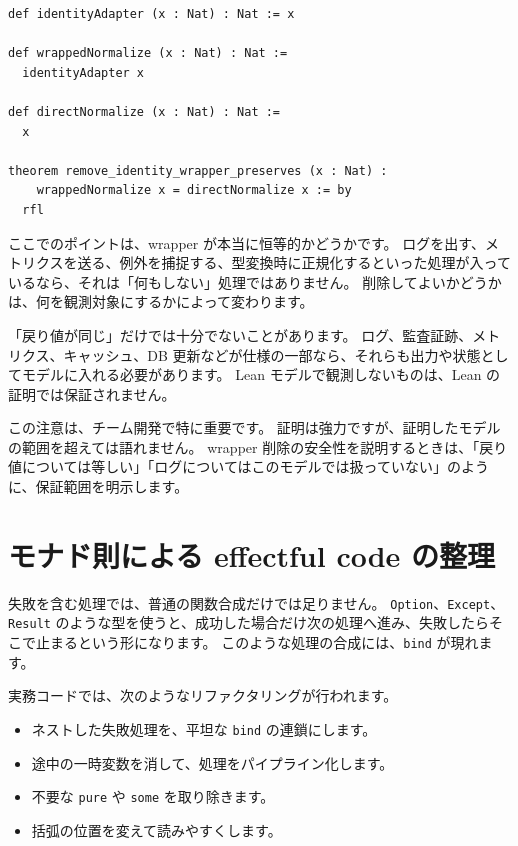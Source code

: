 \begin{listing}[htbp]
\begin{verbatim}
def identityAdapter (x : Nat) : Nat := x

def wrappedNormalize (x : Nat) : Nat :=
  identityAdapter x

def directNormalize (x : Nat) : Nat :=
  x

theorem remove_identity_wrapper_preserves (x : Nat) :
    wrappedNormalize x = directNormalize x := by
  rfl
\end{verbatim}
\caption{\texttt{remove\_identity\_wrapper\_preserves}}
\label{lst:ch34-remove-wrapper}
\end{listing}

ここでのポイントは、wrapper が本当に恒等的かどうかです。
ログを出す、メトリクスを送る、例外を捕捉する、型変換時に正規化するといった処理が入っているなら、それは「何もしない」処理ではありません。
削除してよいかどうかは、何を観測対象にするかによって変わります。

「戻り値が同じ」だけでは十分でないことがあります。
ログ、監査証跡、メトリクス、キャッシュ、DB 更新などが仕様の一部なら、それらも出力や状態としてモデルに入れる必要があります。
Lean モデルで観測しないものは、Lean の証明では保証されません。

この注意は、チーム開発で特に重要です。
証明は強力ですが、証明したモデルの範囲を超えては語れません。
wrapper 削除の安全性を説明するときは、「戻り値については等しい」「ログについてはこのモデルでは扱っていない」のように、保証範囲を明示します。

\section{モナド則による effectful code の整理}

失敗を含む処理では、普通の関数合成だけでは足りません。
\texttt{Option}、\texttt{Except}、\texttt{Result} のような型を使うと、成功した場合だけ次の処理へ進み、失敗したらそこで止まるという形になります。
このような処理の合成には、\texttt{bind} が現れます。

実務コードでは、次のようなリファクタリングが行われます。

\begin{itemize}
\item ネストした失敗処理を、平坦な \texttt{bind} の連鎖にします。
\item 途中の一時変数を消して、処理をパイプライン化します。
\item 不要な \texttt{pure} や \texttt{some} を取り除きます。
\item 括弧の位置を変えて読みやすくします。
\end{itemize}

